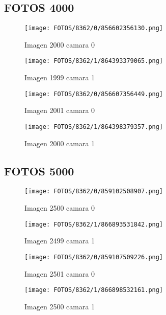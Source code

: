 \documentclass{article}
\begin{document}
\subsection{FOTOS 4000}

\begin{figure}[H]
  \centering
  \begin{minipage}[b]{0.45\textwidth}
    \centering
    \texttt{[image: FOTOS/8362/0/856602356130.png]}
    \caption{Imagen 2000 camara 0}
  \end{minipage}
  \begin{minipage}[b]{0.45\textwidth}
    \centering
    \texttt{[image: FOTOS/8362/1/864393379065.png]}
    \caption{Imagen 1999 camara 1}
  \end{minipage}
  \begin{minipage}[b]{0.45\textwidth}
    \centering
    \texttt{[image: FOTOS/8362/0/856607356449.png]}
    \caption{Imagen 2001 camara 0}
  \end{minipage}
  \begin{minipage}[b]{0.45\textwidth}
    \centering
    \texttt{[image: FOTOS/8362/1/864398379357.png]}
    \caption{Imagen 2000 camara 1}
  \end{minipage}
\end{figure}

\subsection{FOTOS 5000}

\begin{figure}[H]
  \centering
  \begin{minipage}[b]{0.45\textwidth}
    \centering
    \texttt{[image: FOTOS/8362/0/859102508907.png]}
    \caption{Imagen 2500 camara 0}
  \end{minipage}
  \begin{minipage}[b]{0.45\textwidth}
    \centering
    \texttt{[image: FOTOS/8362/1/866893531842.png]}
    \caption{Imagen 2499 camara 1}
  \end{minipage}
  \begin{minipage}[b]{0.45\textwidth}
    \centering
    \texttt{[image: FOTOS/8362/0/859107509226.png]}
    \caption{Imagen 2501 camara 0}
  \end{minipage}
  \begin{minipage}[b]{0.45\textwidth}
    \centering
    \texttt{[image: FOTOS/8362/1/866898532161.png]}
    \caption{Imagen 2500 camara 1}
  \end{minipage}
\end{figure}
\end{document}
